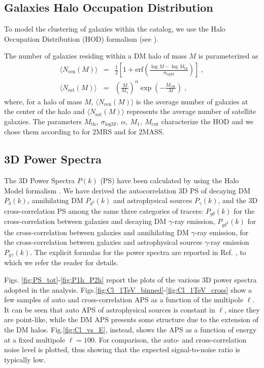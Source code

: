 \subsection{Galaxies Halo Occupation Distribution}
To model the clustering of galaxies within the catalog, we use the Halo Occupation Distribution (HOD) formalism (see  \cite{Zheng:2004id,Berlind:2001xk,Cooray:2002dia}).


The number of galaxies residing within a DM halo of mass $M$ is parameterized as
\begin{eqnarray}
\langle N_\textrm{cen}(M)\rangle &=& \frac{1}{2}\left[1+\textrm{erf}\left(\frac{\log M-\log M_\textrm{th}}{\sigma_\textrm{logM}}\right)\right]\;, \label{eq:HOD1}\\
\langle N_\textrm{sat}(M)\rangle &=& \left( \frac{M}{M_1} \right)^\alpha \exp{\left(-\frac{M_\textrm{cut}}{M}\right)}\;,\label{eq:HOD2}
\end{eqnarray}
where, for a halo of mass $M$, $\langle N_\textrm{cen}(M) \rangle$ is the average number of galaxies at the center of the halo and $\langle N_\textrm{sat}(M)\rangle$ represents the average number of satellite galaxies.
The parameters $M_\textrm{th}, \ \sigma_\textrm{logM}, \ \alpha, \ M_1, \ M_\textrm{cut}$ characterize the HOD and we chose them according to 
\cite{Ando:2017wff} for 2MRS and \cite{Cuoco:2015rfa} for 2MASS.



\subsection{3D Power Spectra}
The 3D Power Spectra $P(k)$  (PS) have been calculated by using the Halo Model formalism \cite{Cooray:2002dia}. We have derived the autocorrelation 3D PS of decaying DM $P_\delta(k)$, annihilating DM $P_{\delta^2}(k)$ and astrophysical sources $P_\gamma(k)$, and the 3D cross-correlation PS among the same three categories of tracers: $P_{g\delta}(k)$ for the cross-correlation between galaxies and decaying DM $\gamma$-ray emission,  $P_{g\delta^2}(k)$ for the cross-correlation between galaxies and annihilating DM $\gamma$-ray emission, for the cross-correlation between galaxies and astrophysical sources $\gamma$-ray emission $P_{g\gamma}(k)$. The explicit formulas for the power spectra are reported in Ref. \cite{Cuoco:2015rfa}, to which we refer the reader for details. 

Figs. \ref{fig:PS_tot}-\ref{fig:P1h_P2h} report the plots of the various 3D power spectra adopted in the analysis. Figs.\ref{fig:Cl_1TeV_binned}-\ref{fig:Cl_1TeV_cross} show a few samples of auto and cross-correlation APS as a function of the multipole $\ell$. It can be seen that auto APS of astrophysical sources is constant in $\ell$, since they are point-like, while the DM APS presents some structure due to the extension of the DM halos. Fig.\ref{fig:Cl_vs_E}, instead, shows the APS as a function of energy at a fixed multipole $\ell=100$. For comparison, the auto- and cross-correlation noise level is plotted, thus showing that the expected signal-to-noise ratio is typically low.



